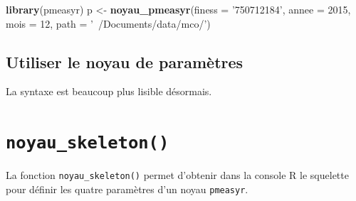 \documentclass[]{book}
\newenvironment{Shaded}{\begin{snugshade}}{\end{snugshade}}
\newcommand{\KeywordTok}[1]{\textcolor[rgb]{0.13,0.29,0.53}{\textbf{#1}}}
\newcommand{\DataTypeTok}[1]{\textcolor[rgb]{0.13,0.29,0.53}{#1}}
\newcommand{\DecValTok}[1]{\textcolor[rgb]{0.00,0.00,0.81}{#1}}
\newcommand{\StringTok}[1]{\textcolor[rgb]{0.31,0.60,0.02}{#1}}
\newcommand{\CommentTok}[1]{\textcolor[rgb]{0.56,0.35,0.01}{\textit{#1}}}
\newcommand{\OperatorTok}[1]{\textcolor[rgb]{0.81,0.36,0.00}{\textbf{#1}}}
\newcommand{\NormalTok}[1]{#1}
\theoremstyle{definition}
\theoremstyle{definition}
\theoremstyle{definition}
\theoremstyle{remark}
\begin{document}
\begin{Shaded}
\begin{Highlighting}[]
\KeywordTok{library}\NormalTok{(pmeasyr)}
\NormalTok{p <-}\StringTok{ }\KeywordTok{noyau_pmeasyr}\NormalTok{(}\DataTypeTok{finess =} \StringTok{'750712184'}\NormalTok{, }
                   \DataTypeTok{annee =} \DecValTok{2015}\NormalTok{, }
                   \DataTypeTok{mois =} \DecValTok{12}\NormalTok{, }
                   \DataTypeTok{path   =} \StringTok{'~/Documents/data/mco/'}\NormalTok{)}
\end{Highlighting}
\end{Shaded}

\subsection{Utiliser le noyau de
paramètres}\label{utiliser-le-noyau-de-parametres}

\begin{Shaded}
\end{Shaded}

\begin{Shaded}
\end{Shaded}

La syntaxe est beaucoup plus lisible désormais.

\section{\texorpdfstring{\texttt{noyau\_skeleton()}}{noyau\_skeleton()}}\label{noyau_skeleton}

La fonction \texttt{noyau\_skeleton()} permet d'obtenir dans la console
R le squelette pour définir les quatre paramètres d'un noyau
\texttt{pmeasyr}.
\end{document}
